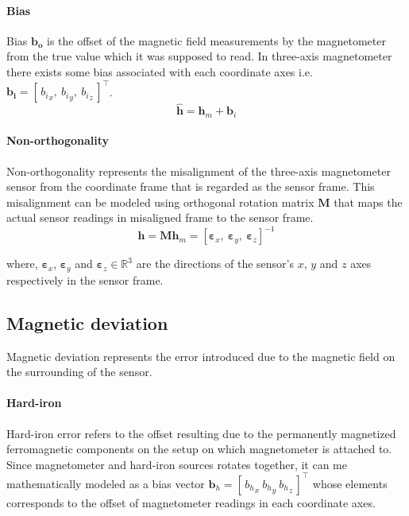 \documentclass[10pt, a4paper]{article}
\begin{document}
\paragraph*{Bias} \label{equ_mg_bias}
Bias $\bm{b_{o}}$ is the offset of the magnetic field measurements by the magnetometer from the true value which it was supposed to read. In three-axis magnetometer there exists some bias associated with each coordinate axes i.e. $\bm{b_{i}} = [\, {b_{i}}_{x}, \: {b_{i}}_{y}, \: {b_{i}}_{z} \,]^{\intercal}$. 
\begin{equation}
\hat{\bm{h}} = \bm{h}_{m} + \bm{b}_{i}
\end{equation}
   
\paragraph*{Non-orthogonality} \label{equ_mg_orthogonality}
Non-orthogonality represents the misalignment of the three-axis magnetometer sensor from the coordinate frame that is regarded as the sensor frame. This misalignment can be modeled using orthogonal rotation matrix $\bm{M}$ that maps the actual sensor readings in misaligned frame to the sensor frame.
\begin{equation}
\hat{\bm{h}} = \bm{M} \bm{h}_{m} = [\bm{\varepsilon}_{x}, \: \bm{\varepsilon}_{y}, \: \bm{\varepsilon}_{z}]^{-1}
\end{equation}

where, $\bm{\varepsilon}_{x}$, $\bm{\varepsilon}_{y}$ and $\bm{\varepsilon}_{z} \in \mathbb{R}^{3}$ are the directions of the sensor's $x$, $y$ and $z$ axes respectively in the sensor frame. 

\subsection{Magnetic deviation}
Magnetic deviation represents the error introduced due to the magnetic field on the surrounding of the sensor.

\paragraph*{Hard-iron} \label{equ_mg_hard}
Hard-iron error refers to the offset resulting due to the permanently magnetized ferromagnetic components on the setup on which magnetometer is attached to. Since magnetometer and hard-iron sources rotates together, it can me mathematically modeled as a bias vector $\bm{b}_{h} = [\,{b_{h}}_{x} \: {b_{h}}_{y} \: {b_{h}}_{z} \,]^{\intercal}$ whose elements corresponds to the offset of magnetometer readings in each coordinate axes.
\end{document}
